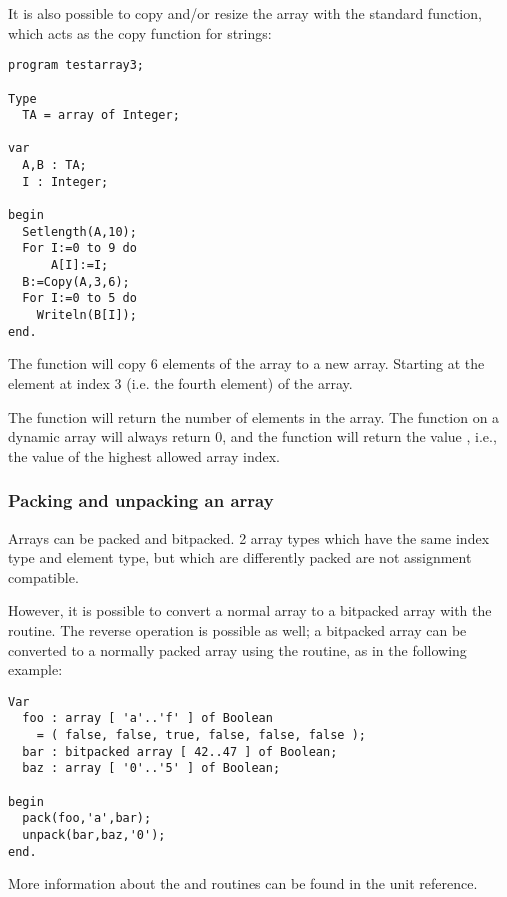 It is also possible to copy and/or resize the array with the standard 
 function, which acts as the copy function for strings:
\begin{verbatim}
program testarray3;

Type
  TA = array of Integer;
  
var   
  A,B : TA;
  I : Integer;

begin
  Setlength(A,10);
  For I:=0 to 9 do
      A[I]:=I;
  B:=Copy(A,3,6);    
  For I:=0 to 5 do
    Writeln(B[I]);
end.  
\end{verbatim}
The  function will copy 6 elements of the array to a new array.
Starting at the element at index 3 (i.e. the fourth element) of the array.

The  function will return the number of elements in the array.
The  function on a dynamic array will always return 0, and the
 function will return the value , i.e., the value of the
highest allowed array index. 


\subsubsection{Packing and unpacking an array}
Arrays can be packed and bitpacked. 2 array types which have the same index
type and element type, but which are differently packed are not assignment 
compatible.

However, it is possible to convert a normal array to a bitpacked array with the
 routine. The reverse operation is possible as well; a bitpacked
array can be converted to a normally packed array using the 
routine, as in the following example:
\begin{verbatim}
Var
  foo : array [ 'a'..'f' ] of Boolean 
    = ( false, false, true, false, false, false );
  bar : bitpacked array [ 42..47 ] of Boolean;
  baz : array [ '0'..'5' ] of Boolean;

begin
  pack(foo,'a',bar);
  unpack(bar,baz,'0');
end.
\end{verbatim}
More information about the  and  routines can be found in the
 unit reference.

%
